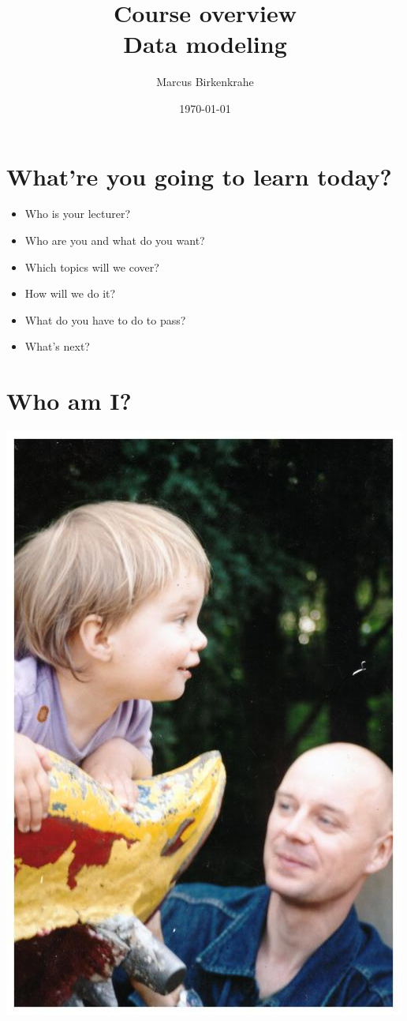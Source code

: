 \documentclass[11pt]{article}
\author{Marcus Birkenkrahe}
\date{\today}
\title{Course overview\\\medskip
\large Data modeling}
\begin{document}
\maketitle
\section*{What're you going to learn today?}
\label{sec:org1ca8995}

\begin{itemize}
\item Who is your lecturer?
\item Who are you and what do you want?
\item Which topics will we cover?
\item How will we do it?
\item What do you have to do to pass?
\item What's next?
\end{itemize}

\section*{Who am I?}
\label{sec:orge9cf6cd}

\begin{center}
\includegraphics[width=.9\linewidth]{./img/marcus.jpg}
\end{center}
\end{document}
